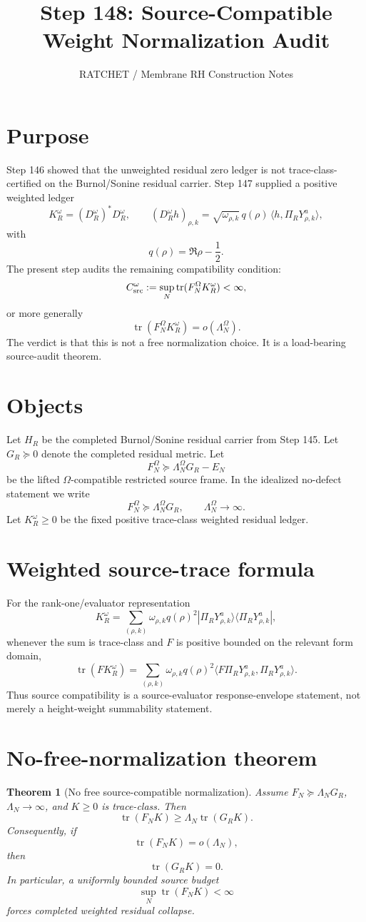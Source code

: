 \documentclass[11pt]{article}
\title{Step 148: Source-Compatible Weight Normalization Audit}
\author{RATCHET / Membrane RH Construction Notes}
\date{}
\newtheorem{theorem}{Theorem}
\begin{document}
\maketitle

\section{Purpose}
Step 146 showed that the unweighted residual zero ledger is not trace-class-certified on the Burnol/Sonine residual carrier. Step 147 supplied a positive weighted ledger
\[
  K_R^\omega=(D_R^\omega)^*D_R^\omega,
  \qquad
  (D_R^\omega h)_{\rho,k}=\sqrt{\omega_{\rho,k}}\,q(\rho)\,\langle h,\Pi_RY^a_{\rho,k}\rangle,
\]
with
\[
  q(\rho)=\Re\rho-\frac12.
\]
The present step audits the remaining compatibility condition:
\[
  C_{\rm src}^\omega
  :=\sup_N \operatorname{tr}(F_N^\Omega K_R^\omega)<\infty,
\]
or more generally
\[
  \operatorname{tr}(F_N^\Omega K_R^\omega)=o(\Lambda_N^\Omega).
\]
The verdict is that this is not a free normalization choice. It is a load-bearing source-audit theorem.

\section{Objects}
Let $H_R$ be the completed Burnol/Sonine residual carrier from Step 145. Let $G_R\succeq0$ denote the completed residual metric. Let
\[
  F_N^\Omega\succeq \Lambda_N^\Omega G_R - E_N
\]
be the lifted $\Omega$-compatible restricted source frame. In the idealized no-defect statement we write
\[
  F_N^\Omega\succeq \Lambda_N^\Omega G_R,
  \qquad \Lambda_N^\Omega\to\infty.
\]
Let $K_R^\omega\ge0$ be the fixed positive trace-class weighted residual ledger.

\section{Weighted source-trace formula}
For the rank-one/evaluator representation
\[
  K_R^\omega
  =\sum_{(\rho,k)} \omega_{\rho,k}q(\rho)^2
     |\Pi_RY^a_{\rho,k}\rangle\langle \Pi_RY^a_{\rho,k}|,
\]
whenever the sum is trace-class and $F$ is positive bounded on the relevant form domain,
\[
\boxed{
  \operatorname{tr}(F K_R^\omega)
  =\sum_{(\rho,k)}\omega_{\rho,k}q(\rho)^2
    \langle F\Pi_RY^a_{\rho,k},\Pi_RY^a_{\rho,k}\rangle.
}
\]
Thus source compatibility is a source-evaluator response-envelope statement, not merely a height-weight summability statement.

\section{No-free-normalization theorem}
\begin{theorem}[No free source-compatible normalization]
Assume $F_N\succeq\Lambda_NG_R$, $\Lambda_N\to\infty$, and $K\ge0$ is trace-class. Then
\[
  \operatorname{tr}(F_NK)
  \ge
  \Lambda_N\operatorname{tr}(G_RK).
\]
Consequently, if
\[
  \operatorname{tr}(F_NK)=o(\Lambda_N),
\]
then
\[
  \operatorname{tr}(G_RK)=0.
\]
In particular, a uniformly bounded source budget
\[
  \sup_N\operatorname{tr}(F_NK)<\infty
\]
forces completed weighted residual collapse.
\end{theorem}
\end{document}
